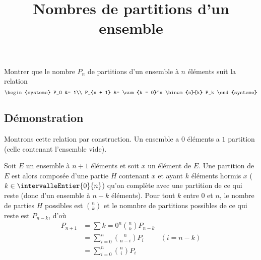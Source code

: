 \documentclass[fontsize=12pt,twoside=false,parskip=half]{scrartcl}
\title{Nombres de partitions d’un ensemble}
\date{}
\author{}
\begin{document}
\maketitle
   \begin{Theoreme}
      Montrer que le nombre $P_n$ de partitions d’un ensemble à $n$ éléments suit la relation
      \[
         \begin{systeme}
            P_0       &= 1\\
            P_{n + 1} &= \sum{k = 0}^n \binom{n}{k} P_k
         \end{systeme}
      \]
   \end{Theoreme}
   \subsection{Démonstration}
      Montrons cette relation par construction. Un ensemble a $0$ éléments a $1$ partition
      (celle contenant l’ensemble vide).

      Soit $E$ un ensemble à $n + 1$ éléments et soit $x$ un élément de $E$.
      Une partition de $E$ est alors composée d’une partie $H$
      contenant $x$ et ayant $k$ éléments hormis $x$ ($k \in \intervalleEntier{0}{n}$) qu’on complète avec une partition de ce qui reste (donc d’un ensemble à $n - k$ 
      éléments). Pour tout $k$ entre $0$ et $n$, le nombre de parties $H$ possibles
      est $\binom{n}{k}$ et le nomnbre de partitions possibles de ce qui reste est 
      $P_{n - k}$, d’où
      \begin{align*}
         P_{n + 1} &= \sum{k = 0}^n \binom{n}{k} P_{n - k}\\
                   &= \sum_{i = 0}^n \binom{n}{n - i} P_i & (i = n - k)\\
                   &=  \sum_{i = 0}^n \binom{n}{i} P_i
      \end{align*}      
\end{document}
